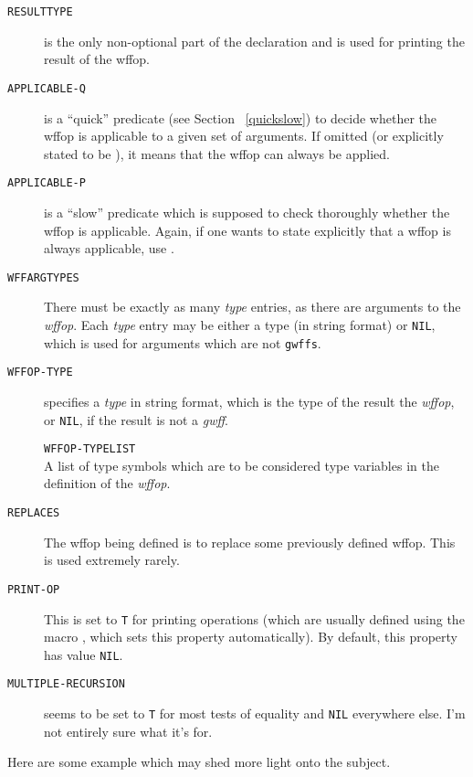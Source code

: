 \begin{description}
\item [{\tt RESULTTYPE}] is the only non-optional part of the declaration and
is used for printing the result of the wffop.

\item [{\tt APPLICABLE-Q}] is a ``quick'' predicate (see Section ~\ref{quickslow})
to decide whether the wffop is applicable to a given set of arguments.
If omitted (or explicitly stated to be ), it means that the
wffop can always be applied.

\item [{\tt APPLICABLE-P}] is a ``slow'' predicate
which is supposed to check thoroughly whether the wffop is applicable.
Again, if one wants to state explicitly that a wffop is always applicable,
use .

\item [{\tt WFFARGTYPES}] There must be exactly as many {\it type} entries, as there
are arguments to the {\it wffop}.  Each {\it type} entry may be either a
type (in string format) or {\tt NIL}, which is used for arguments which
are not {\tt gwffs}.

\item [{\tt WFFOP-TYPE}] specifies a {\it type} in string format, which is the
type of the result the {\it wffop}, or {\tt NIL}, if the result is not a
{\it gwff}.

{\tt WFFOP-TYPELIST} \\ A list of type symbols which are to be considered
type variables in the definition of the {\it wffop}.

\item [{\tt REPLACES}] The wffop being defined is to replace some previously defined
wffop. This is used extremely rarely.

\item [{\tt PRINT-OP}] This is set to {\tt T} for printing operations (which are 
usually defined using the macro , which sets this 
property automatically). By default, this property has value {\tt NIL}.

\item [{\tt MULTIPLE-RECURSION}]  seems to be set to {\tt T} for most tests of
equality and {\tt NIL} everywhere else. I'm not entirely sure what it's for.
\end{description}

Here are some example which may shed more light onto the subject.

